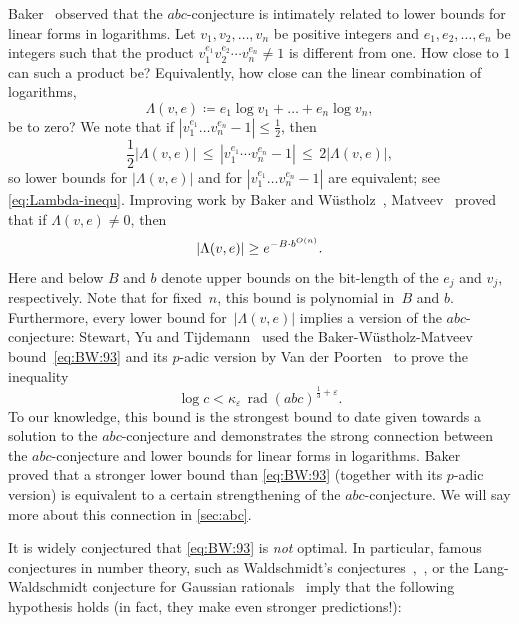 \documentclass[a4paper,USenglish,cleveref,numberwithinsect]{lipics-v2021}
\DeclareMathOperator{\rad}{rad}
\newcommand{\abc}{\texorpdfstring{$abc$}{abc}}
\DeclarePairedDelimiter\abs{\lvert}{\rvert}
\numberwithin{equation}{section}
\begin{document}
Baker~\cite{baker98} observed that the \abc-conjecture is intimately related to lower bounds
for linear forms in logarithms.
Let $v_1,v_2,\dots,v_n$ be positive integers and $e_1,e_2,\dots,e_n$ be integers such that
the product $v_1^{e_1} v_2^{e_2}\cdots v_n^{e_n}\neq 1$ is different from one.
How close to $1$ can such a product be?
Equivalently, how close can the linear combination of logarithms,
\begin{equation}\label{eq:def-Lambda(v,e)}
  \Lambda(v,e) \coloneqq e_1\log v_1 +\ldots + e_n \log v_n ,
\end{equation}
be to zero?
We note that if
$|v_1^{e_1}\dots v_n^{e_n}-1|\leq \frac{1}{2}$,
then
\[
  \frac{1}{2} |\Lambda(v,e)| \, \leq \, |v_1^{e_1} \cdots v_n^{e_n}-1| \, \leq \, 2 |\Lambda(v,e)| ,
\]
so lower bounds for $|\Lambda(v,e)|$ and for $|v_1^{e_1}\dots v_n^{e_n}-1|$ are equivalent;
see \cref{eq:Lambda-inequ}.
Improving work by Baker and W\"ustholz~\cite{wustholz1993}, Matveev~\cite{matveev} proved that
if $\Lambda(v,e)\ne 0$, then
\begin{equation}\label{eq:BW:93}
  \abs{ \Lambda(v,e) } \ge e^{-B \cdot b^{O(n)}}.
\end{equation}
Here and below $B$ and $b$ denote upper bounds on the bit-length of the $e_j$ and $v_j$, respectively.
Note that for fixed~$n$, this bound is polynomial in~$B$ and $b$.
Furthermore, every lower bound for~$|\Lambda(v,e)|$ implies a version of the \abc-conjecture:
Stewart, Yu and Tijdemann~\cite{yu-stewart, stewart_oesterle-masser_1986}
used the Baker-W\"{u}stholz-Matveev bound~\eqref{eq:BW:93} and its $p$-adic version by Van der Poorten~\cite{vdpoorten}
to prove the inequality
\[
  \log c < \kappa_\varepsilon\, \rad(abc)^{\frac{1}{3}+\varepsilon}.
\]
To our knowledge, this bound is the strongest bound to date given towards a solution to
the \abc-conjecture and demonstrates the strong connection between the \abc-conjecture and
lower bounds for linear forms in logarithms.
Baker~\cite{baker98} proved that a stronger lower bound than \eqref{eq:BW:93}
(together with its $p$-adic version)
is equivalent to a certain strengthening of the \abc-conjecture.
We will say more about this connection in \cref{sec:abc}.

It is widely conjectured that \eqref{eq:BW:93} is \emph{not} optimal.
In particular, famous conjectures in number theory,
such as Waldschmidt's conjectures~\cite[Conjecture~14.25, p.~547]{waldschmidt-2},~\cite[Conjecture~4.14]{waldschmidt-1},
or the Lang-Waldschmidt conjecture
for Gaussian rationals~\cite[Introduction to Chapters~X and~XI]{lang-elliptic-curves}
imply that the following hypothesis holds (in fact, they make even stronger predictions!):
\end{document}
